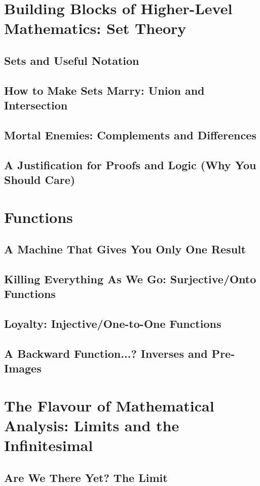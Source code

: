 \documentclass[openany]{book}
\newcommand{\secmark}{}
\newcommand{\marktotoc}[1]{\renewcommand{\secmark}{#1}}
\newenvironment{advanced}
{\renewcommand{\secmark}{\dag}
\addtocontents{toc}{\protect\marktotoc{\dag}}}
{\addtocontents{toc}{\protect\marktotoc{}}}
\begin{document}
\begin{advanced}
\chapter{Building Blocks of Higher-Level Mathematics: Set \mbox{Theory}}
\section{Sets and Useful Notation}
\section{How to Make Sets Marry: Union and Intersection}
\section{Mortal Enemies: Complements and Differences}
\section{A Justification for Proofs and Logic (Why You Should Care)}

\chapter{Functions}
\section{A Machine That Gives You Only One Result}
\section{Killing Everything As We Go: Surjective/Onto Functions}
\section{Loyalty: Injective/One-to-One Functions}
\section{A Backward Function...? Inverses and Pre-Images}

\chapter{The Flavour of Mathematical Analysis: Limits and the Infinitesimal}
\section{Are We There Yet? The Limit}

\end{advanced}
\end{document}
